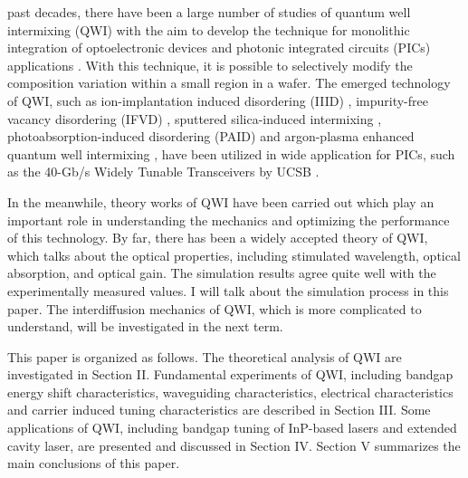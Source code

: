  past decades, there have been a large number
of studies of quantum well intermixing (QWI) with the aim to develop
the technique for monolithic integration of optoelectronic devices
and photonic integrated circuits (PICs) applications \cite{JMarsh}.
With this technique, it is possible to selectively modify the
composition variation within a small region in a wafer. The emerged
technology of QWI, such as ion-implantation induced disordering
(IIID) \cite{IIID}, impurity-free vacancy disordering (IFVD)
\cite{IFVD}, sputtered silica-induced intermixing \cite{SiO2},
photoabsorption-induced disordering (PAID) \cite{PAID} and
argon-plasma enhanced quantum well intermixing \cite{ArPlasma}, have
been utilized in wide application for PICs, such as the 40-Gb/s
Widely Tunable Transceivers by UCSB \cite{40G}.

In the meanwhile, theory works of QWI have been carried out which
play an important role in understanding the mechanics and optimizing
the performance of this technology. By far, there has been a widely
accepted theory of QWI, which talks about the optical properties,
including stimulated wavelength, optical absorption, and optical
gain. The simulation results agree quite well with the
experimentally measured values. I will talk about the simulation
process in this paper. The interdiffusion mechanics of QWI, which is
more complicated to understand, will be investigated in the next
term.

This paper is organized as follows. The theoretical analysis of QWI
are investigated in Section II. Fundamental experiments of QWI,
including bandgap energy shift characteristics, waveguiding
characteristics, electrical characteristics and carrier induced
tuning characteristics are described in Section III. Some
applications of QWI, including bandgap tuning of InP-based lasers
and extended cavity laser, are presented and discussed in Section
IV. Section V summarizes the main conclusions of this paper.
